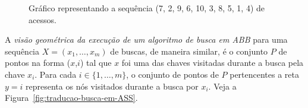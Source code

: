 \begin{figure}
    \caption{Gráfico representando a sequência (7, 2, 9, 6, 10, 3, 8, 5, 1, 4) de acessos.}
\label{fig:busca_padrao}
\end{figure}

A \textit{visão geométrica da execução de um algoritmo de busca em ABB} para uma sequência $X = (x_{1},\ldots,x_{m})$ de buscas, de maneira similar, é o conjunto $P$ de pontos na forma ($x$,$i$) tal que $x$ foi uma das chaves visitadas durante a busca pela chave $x_i$. Para cada $i \in \{1,\ldots,m\}$, o conjunto de pontos de $P$ pertencentes a reta $y = i$ representa os nós visitados durante a busca por $x_i$. Veja a Figura~\ref{fig:traducao-busca-em-ASS}.

